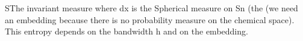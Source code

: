 SThe invariant measure where dx is the Spherical measure on Sn (the (we need an embedding because there is no probability measure on the chemical space). 
This entropy depends on the bandwidth h and on the embedding.
